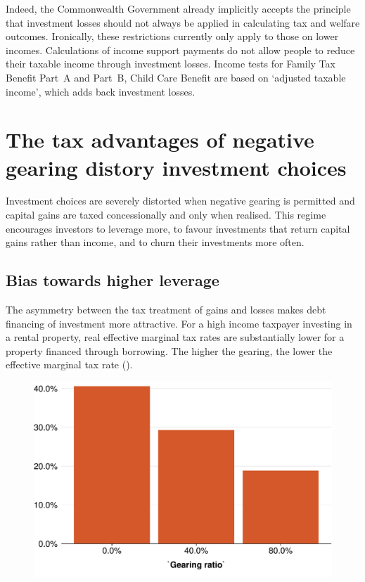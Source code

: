 \documentclass{grattan}\usepackage[]{graphicx}\usepackage[]{color}
\begin{document}
Indeed, the Commonwealth Government already implicitly accepts the principle that investment losses should not always be applied in calculating tax and welfare outcomes. Ironically, these restrictions currently only apply to those on lower incomes. Calculations of income support payments do not allow people to reduce their taxable income through investment losses. Income tests for Family Tax Benefit Part~A and Part~B, Child Care Benefit are based on `adjusted taxable income', which adds back investment losses. 

\section{The tax advantages of negative gearing distory investment choices}
Investment choices are severely distorted when negative gearing is permitted and capital gains are taxed concessionally and only when realised. This regime encourages investors to leverage more, to favour investments that return capital gains rather than income, and to churn their investments more often.

\subsection{Bias towards higher leverage}
The asymmetry between the tax treatment of gains and losses makes debt financing of investment more attractive. For a high income taxpayer investing in a rental property, real effective marginal tax rates are substantially lower for a property financed through borrowing. The higher the gearing, the lower the effective marginal tax rate (). 

\begin{figure}

\includegraphics[width=\columnwidth]{CGT-NG-atlas//EMTR-by-gearing-1}

\end{figure}
\end{document}
